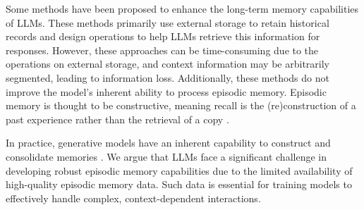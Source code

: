 Some methods \cite{zhong2024memorybank,barmann2024episodic,fountas2024human,packer2023memgpt,gao2024memory,hu2023chatdb} have been proposed to enhance the long-term memory capabilities of LLMs. These methods primarily use external storage to retain historical records and design operations to help LLMs retrieve this information for responses. However, these approaches can be time-consuming due to the operations on external storage, and context information may be arbitrarily segmented, leading to information loss. Additionally, these methods do not improve the model's inherent ability to process episodic memory. Episodic memory is thought to be constructive, meaning recall is the (re)construction of a past experience rather than the retrieval of a copy \cite{sprott1933remembering,schacter2012constructive}.

In practice, generative models have an inherent capability to construct and consolidate memories \cite{spens2024generative}. We argue that LLMs face a significant challenge in developing robust episodic memory capabilities due to the limited availability of high-quality episodic memory data. Such data is essential for training models to effectively handle complex, context-dependent interactions.


